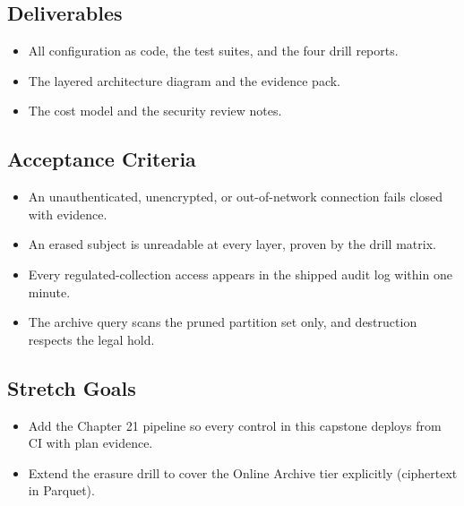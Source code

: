 \subsection*{Deliverables}
\begin{itemize}
    \item All configuration as code, the test suites, and the four drill reports.
    \item The layered architecture diagram and the evidence pack.
    \item The cost model and the security review notes.
\end{itemize}

\subsection*{Acceptance Criteria}
\begin{itemize}
    \item An unauthenticated, unencrypted, or out-of-network connection fails closed with evidence.
    \item An erased subject is unreadable at every layer, proven by the drill matrix.
    \item Every regulated-collection access appears in the shipped audit log within one minute.
    \item The archive query scans the pruned partition set only, and destruction respects the legal hold.
\end{itemize}

\subsection*{Stretch Goals}
\begin{itemize}
    \item Add the Chapter 21 pipeline so every control in this capstone deploys from CI with plan evidence.
    \item Extend the erasure drill to cover the Online Archive tier explicitly (ciphertext in Parquet).
\end{itemize}
